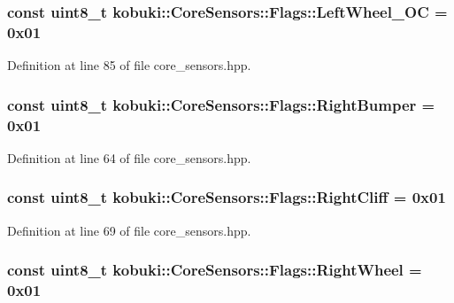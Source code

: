 \subsubsection[{\-Left\-Wheel\-\_\-\-O\-C}]{\setlength{\rightskip}{0pt plus 5cm}const uint8\-\_\-t {\bf kobuki\-::\-Core\-Sensors\-::\-Flags\-::\-Left\-Wheel\-\_\-\-O\-C} = 0x01\hspace{0.3cm}{\ttfamily  [static]}}\label{structkobuki_1_1CoreSensors_1_1Flags_a18f5b7c46447fa7a5661290ef052a863}


\-Definition at line 85 of file core\-\_\-sensors.\-hpp.

\subsubsection[{\-Right\-Bumper}]{\setlength{\rightskip}{0pt plus 5cm}const uint8\-\_\-t {\bf kobuki\-::\-Core\-Sensors\-::\-Flags\-::\-Right\-Bumper} = 0x01\hspace{0.3cm}{\ttfamily  [static]}}\label{structkobuki_1_1CoreSensors_1_1Flags_a46a0af0ca751224ee77ca8229dee8d74}


\-Definition at line 64 of file core\-\_\-sensors.\-hpp.

\subsubsection[{\-Right\-Cliff}]{\setlength{\rightskip}{0pt plus 5cm}const uint8\-\_\-t {\bf kobuki\-::\-Core\-Sensors\-::\-Flags\-::\-Right\-Cliff} = 0x01\hspace{0.3cm}{\ttfamily  [static]}}\label{structkobuki_1_1CoreSensors_1_1Flags_a26c8b51ff04d0aa820b11362cde089a9}


\-Definition at line 69 of file core\-\_\-sensors.\-hpp.

\subsubsection[{\-Right\-Wheel}]{\setlength{\rightskip}{0pt plus 5cm}const uint8\-\_\-t {\bf kobuki\-::\-Core\-Sensors\-::\-Flags\-::\-Right\-Wheel} = 0x01\hspace{0.3cm}{\ttfamily  [static]}}\label{structkobuki_1_1CoreSensors_1_1Flags_adcbe63546742933ef4f2e60ba2ba206b}


